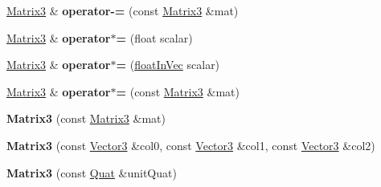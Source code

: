 \begin{DoxyCompactItemize}
\item 
\hypertarget{classVectormath_1_1Aos_1_1Matrix3_ac3edd9953ac35b9d435624f409b2ca66}{\hyperlink{classVectormath_1_1Aos_1_1Matrix3}{Matrix3} \& {\bfseries operator-\/=} (const \hyperlink{classVectormath_1_1Aos_1_1Matrix3}{Matrix3} \&mat)}\label{classVectormath_1_1Aos_1_1Matrix3_ac3edd9953ac35b9d435624f409b2ca66}

\item 
\hypertarget{classVectormath_1_1Aos_1_1Matrix3_a4a09fe7dbbd8f95d0c22ed27a60b77ea}{\hyperlink{classVectormath_1_1Aos_1_1Matrix3}{Matrix3} \& {\bfseries operator$\ast$=} (float scalar)}\label{classVectormath_1_1Aos_1_1Matrix3_a4a09fe7dbbd8f95d0c22ed27a60b77ea}

\item 
\hypertarget{classVectormath_1_1Aos_1_1Matrix3_a02e50b29f6bdcc8c5e8f53b23ae79494}{\hyperlink{classVectormath_1_1Aos_1_1Matrix3}{Matrix3} \& {\bfseries operator$\ast$=} (\hyperlink{classVectormath_1_1floatInVec}{float\-In\-Vec} scalar)}\label{classVectormath_1_1Aos_1_1Matrix3_a02e50b29f6bdcc8c5e8f53b23ae79494}

\item 
\hypertarget{classVectormath_1_1Aos_1_1Matrix3_a87488f974b0fad884071127e99165dc5}{\hyperlink{classVectormath_1_1Aos_1_1Matrix3}{Matrix3} \& {\bfseries operator$\ast$=} (const \hyperlink{classVectormath_1_1Aos_1_1Matrix3}{Matrix3} \&mat)}\label{classVectormath_1_1Aos_1_1Matrix3_a87488f974b0fad884071127e99165dc5}

\item 
\hypertarget{classVectormath_1_1Aos_1_1Matrix3_ad40ce9469c3eb035e45955e197fb2f69}{{\bfseries Matrix3} (const \hyperlink{classVectormath_1_1Aos_1_1Matrix3}{Matrix3} \&mat)}\label{classVectormath_1_1Aos_1_1Matrix3_ad40ce9469c3eb035e45955e197fb2f69}

\item 
\hypertarget{classVectormath_1_1Aos_1_1Matrix3_a4f5ff411513382c646cd1aa71111c4bc}{{\bfseries Matrix3} (const \hyperlink{classVectormath_1_1Aos_1_1Vector3}{Vector3} \&col0, const \hyperlink{classVectormath_1_1Aos_1_1Vector3}{Vector3} \&col1, const \hyperlink{classVectormath_1_1Aos_1_1Vector3}{Vector3} \&col2)}\label{classVectormath_1_1Aos_1_1Matrix3_a4f5ff411513382c646cd1aa71111c4bc}

\item 
\hypertarget{classVectormath_1_1Aos_1_1Matrix3_a3fa42f848e2674bcadf512fe13a015ea}{{\bfseries Matrix3} (const \hyperlink{classVectormath_1_1Aos_1_1Quat}{Quat} \&unit\-Quat)}\label{classVectormath_1_1Aos_1_1Matrix3_a3fa42f848e2674bcadf512fe13a015ea}


\end{DoxyCompactItemize}
